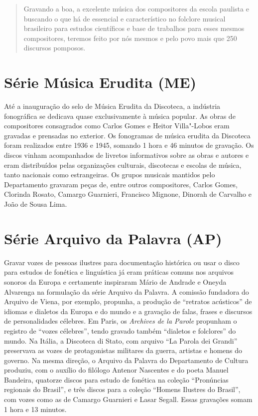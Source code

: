 \begin{quote}
Gravando a boa, a excelente música dos compositores da escola paulista e
buscando o que há de essencial e característico no folclore musical
brasileiro para estudos científicos e base de trabalhos para esses
mesmos compositores, teremos feito por nós mesmos e pelo povo mais que
250 discursos pomposos.
\end{quote}

\section{Série Música Erudita (ME)}

Até a inauguração do selo de Música Erudita da Discoteca, a indústria
fonográfica se dedicava quase exclusivamente à música popular. As obras
de compositores consagrados como Carlos Gomes e Heitor Villa"-Lobos eram
gravadas e prensadas no exterior. Os fonogramas de música erudita da
Discoteca foram realizados entre 1936 e 1945, somando 1 hora e 46
minutos de gravação. Os discos vinham acompanhados de livretos
informativos sobre as obras e autores e eram distribuídos pelas
organizações culturais, discotecas e escolas de música, tanto nacionais
como estrangeiras. Os grupos musicais mantidos pelo Departamento
gravaram peças de, entre outros compositores, Carlos Gomes, Clorinda
Rosato, Camargo Guarnieri, Francisco Mignone, Dinorah de Carvalho e João
de Sousa Lima.

\section{Série Arquivo da Palavra (AP)}

Gravar vozes de pessoas ilustres para documentação histórica ou usar o
disco para estudos de fonética e linguística já eram práticas comuns nos
arquivos sonoros da Europa e certamente inspiraram Mário de Andrade e
Oneyda Alvarenga na formulação da série Arquivo da Palavra. A comissão
fundadora do Arquivo de Viena, por exemplo, propunha, a produção de
``retratos acústicos'' de idiomas e dialetos da Europa e do mundo e a
gravação de falas, frases e discursos de personalidades célebres. Em
Paris, os \emph{Archives de la Parole} propunham o registro de ``vozes
célebres'', tendo gravado também ``dialetos e folclores'' do mundo. Na
Itália, a Discoteca di Stato, com arquivo ``La Parola dei Grandi''
preservava as vozes de protagonistas militares da guerra, artistas e
homens do governo. Na mesma direção, o Arquivo da Palavra do
Departamento de Cultura produziu, com o auxílio do filólogo Antenor
Nascentes e do poeta Manuel Bandeira, quatorze discos para estudo de
fonética na coleção ``Pronúncias regionais do Brasil'', e três discos
para a coleção ``Homens Ilustres do Brasil'', com vozes como as de
Camargo Guarnieri e Lasar Segall. Essas gravações somam 1 hora e 13
minutos.

